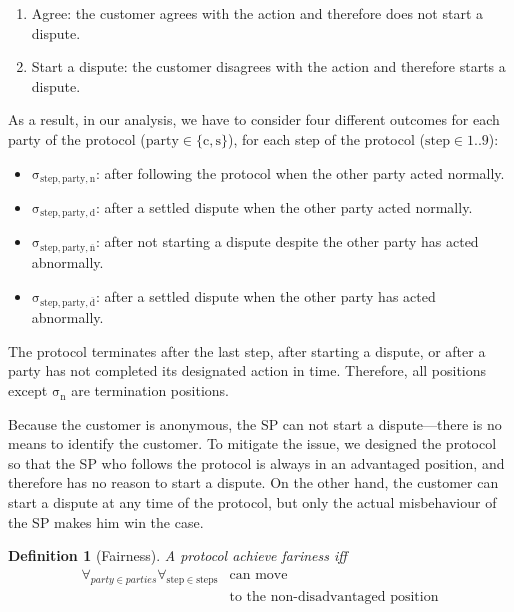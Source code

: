 \documentclass{ieeeaccess}
\newtheorem{definition}{Definition}
\begin{document}
\begin{enumerate}
\def\labelenumi{\arabic{enumi}.}

\item Agree: the customer agrees with the action and therefore does not start a dispute.
\item Start a dispute: the customer disagrees with the action and therefore starts a dispute.
\end{enumerate}

As a result, in our analysis, we have to consider four different outcomes for each party of the protocol ($\mathrm{party \in \{c, s}\}$), for each step of the protocol ($\mathrm{step \in 1..9}$):

\begin{itemize}

\item
  $\mathrm{\sigma_{step,party,n}}$: after following the protocol when the other party acted normally.
\item
  $\mathrm{\sigma_{step,party,d}}$: after a settled dispute when the other party acted normally.
\item
  $\mathrm{\sigma_{step,party,\overline{n}}}$: after not starting a dispute despite the other party has acted abnormally.
\item
  $\mathrm{\sigma_{step,party,\overline{d}}}$: after a settled dispute when the other party has acted abnormally.
\end{itemize}



The protocol terminates after the last step, after starting a dispute, or after a party has not completed its designated action in time. Therefore, all positions except $\mathrm{\sigma_n}$ are termination positions.

Because the customer is anonymous, the SP can not start a dispute—there is no means to identify the customer. To mitigate the issue, we designed the protocol so that the SP who follows the protocol is always in an advantaged position, and therefore has no reason to start a dispute. On the other hand, the customer can start a dispute at any time of the protocol, but only the actual misbehaviour of the SP makes him win the case.

\begin{definition}[Fairness] \label{def:fairness}
A protocol achieve fariness iff 
\begin{equation*}
\begin{split}
\forall_{party \in parties}\forall_{\mathrm{step} \in \mathrm{steps}} &\operatorname{can\ move}\\
&\operatorname{to\ the\ non-disadvantaged\ position} 
\end{split}
\end{equation*}

\end{definition}
\end{document}
